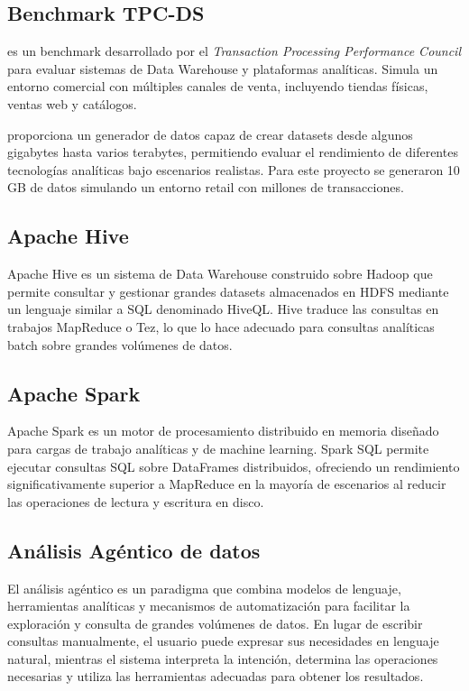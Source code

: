 \subsection{Benchmark TPC-DS}

\tpcds{} es un benchmark desarrollado por el \textit{Transaction Processing Performance
Council} para evaluar sistemas de Data Warehouse y plataformas analíticas. Simula un
entorno comercial con múltiples canales de venta, incluyendo tiendas físicas, ventas web
y catálogos.

\tpcds{} proporciona un generador de datos capaz de crear datasets desde algunos gigabytes
hasta varios terabytes, permitiendo evaluar el rendimiento de diferentes tecnologías
analíticas bajo escenarios realistas. Para este proyecto se generaron 10 GB de datos
simulando un entorno retail con millones de transacciones.

\subsection{Apache Hive}

Apache Hive es un sistema de Data Warehouse construido sobre Hadoop que permite consultar
y gestionar grandes datasets almacenados en HDFS mediante un lenguaje similar a SQL
denominado HiveQL. Hive traduce las consultas en trabajos MapReduce o Tez, lo que lo hace
adecuado para consultas analíticas batch sobre grandes volúmenes de datos.

\subsection{Apache Spark}

Apache Spark es un motor de procesamiento distribuido en memoria diseñado para cargas de
trabajo analíticas y de machine learning. Spark SQL permite ejecutar consultas SQL sobre
DataFrames distribuidos, ofreciendo un rendimiento significativamente superior a MapReduce
en la mayoría de escenarios al reducir las operaciones de lectura y escritura en disco.

\subsection{Análisis Agéntico de datos}

El análisis agéntico es un paradigma que combina modelos de lenguaje, herramientas
analíticas y mecanismos de automatización para facilitar la exploración y consulta de
grandes volúmenes de datos. En lugar de escribir consultas manualmente, el usuario puede
expresar sus necesidades en lenguaje natural, mientras el sistema interpreta la intención,
determina las operaciones necesarias y utiliza las herramientas adecuadas para obtener
los resultados.

